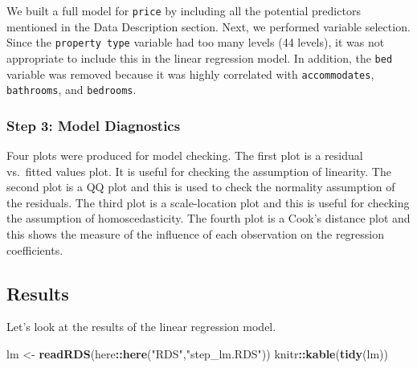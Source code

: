 \documentclass[
]{article}
\newenvironment{Shaded}{\begin{snugshade}}{\end{snugshade}}
\newcommand{\KeywordTok}[1]{\textcolor[rgb]{0.13,0.29,0.53}{\textbf{#1}}}
\newcommand{\NormalTok}[1]{#1}
\newcommand{\OperatorTok}[1]{\textcolor[rgb]{0.81,0.36,0.00}{\textbf{#1}}}
\newcommand{\StringTok}[1]{\textcolor[rgb]{0.31,0.60,0.02}{#1}}
\begin{document}
We built a full model for \texttt{price} by including all the potential
predictors mentioned in the Data Description section. Next, we performed
variable selection. Since the \texttt{property\ type} variable had too
many levels (44 levels), it was not appropriate to include this in the
linear regression model. In addition, the \texttt{bed} variable was
removed because it was highly correlated with \texttt{accommodates},
\texttt{bathrooms}, and \texttt{bedrooms}.

\hypertarget{step-3-model-diagnostics}{%
\subsubsection{Step 3: Model
Diagnostics}\label{step-3-model-diagnostics}}

Four plots were produced for model checking. The first plot is a
residual vs.~fitted values plot. It is useful for checking the
assumption of linearity. The second plot is a QQ plot and this is used
to check the normality assumption of the residuals. The third plot is a
scale-location plot and this is useful for checking the assumption of
homoscedasticity. The fourth plot is a Cook's distance plot and this
shows the measure of the influence of each observation on the regression
coefficients.

\hypertarget{results}{%
\subsection{Results}\label{results}}

Let's look at the results of the linear regression model.

\begin{Shaded}
\begin{Highlighting}[]
\NormalTok{lm <-}\StringTok{ }\KeywordTok{readRDS}\NormalTok{(here}\OperatorTok{::}\KeywordTok{here}\NormalTok{(}\StringTok{"RDS"}\NormalTok{,}\StringTok{"step_lm.RDS"}\NormalTok{))}
\NormalTok{knitr}\OperatorTok{::}\KeywordTok{kable}\NormalTok{(}\KeywordTok{tidy}\NormalTok{(lm))}
\end{Highlighting}
\end{Shaded}
\end{document}
